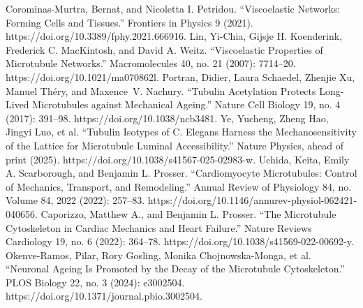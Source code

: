 

\begin{thebibliography}{00}

Corominas-Murtra, Bernat, and Nicoletta I. Petridou. “Viscoelastic Networks: Forming Cells and Tissues.” Frontiers in Physics 9 (2021). https://doi.org/10.3389/fphy.2021.666916.
Lin, Yi-Chia, Gijsje H. Koenderink, Frederick C. MacKintosh, and David A. Weitz. “Viscoelastic Properties of Microtubule Networks.” Macromolecules 40, no. 21 (2007): 7714–20. https://doi.org/10.1021/ma070862l.
Portran, Didier, Laura Schaedel, Zhenjie Xu, Manuel Théry, and Maxence V. Nachury. “Tubulin Acetylation Protects Long-Lived Microtubules against Mechanical Ageing.” Nature Cell Biology 19, no. 4 (2017): 391–98. https://doi.org/10.1038/ncb3481.
Ye, Yucheng, Zheng Hao, Jingyi Luo, et al. “Tubulin Isotypes of C. Elegans Harness the Mechanosensitivity of the Lattice for Microtubule Luminal Accessibility.” Nature Physics, ahead of print (2025). https://doi.org/10.1038/s41567-025-02983-w.
Uchida, Keita, Emily A. Scarborough, and Benjamin L. Prosser. “Cardiomyocyte Microtubules: Control of Mechanics, Transport, and Remodeling.” Annual Review of Physiology 84, no. Volume 84, 2022 (2022): 257–83. https://doi.org/10.1146/annurev-physiol-062421-040656.
Caporizzo, Matthew A., and Benjamin L. Prosser. “The Microtubule Cytoskeleton in Cardiac Mechanics and Heart Failure.” Nature Reviews Cardiology 19, no. 6 (2022): 364–78. https://doi.org/10.1038/s41569-022-00692-y.
Okenve-Ramos, Pilar, Rory Gosling, Monika Chojnowska-Monga, et al. “Neuronal Ageing Is Promoted by the Decay of the Microtubule Cytoskeleton.” PLOS Biology 22, no. 3 (2024): e3002504. https://doi.org/10.1371/journal.pbio.3002504.

 
% 
\end{thebibliography}

